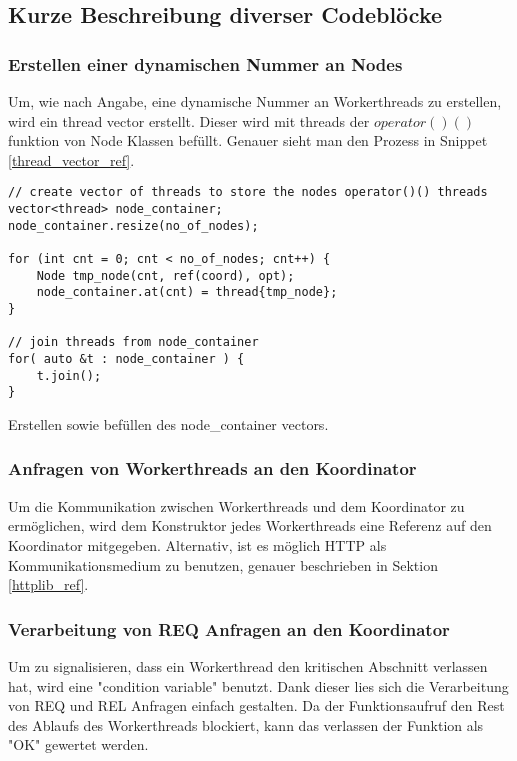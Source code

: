\documentclass[12pt, letterpaper]{article}
\newenvironment{code}{\captionsetup{type=listing}}{}
\begin{document}
\subsection{Kurze Beschreibung diverser Codeblöcke}

\subsubsection{Erstellen einer dynamischen Nummer an Nodes}
Um, wie nach Angabe, eine dynamische Nummer an Workerthreads zu erstellen, wird ein thread vector erstellt. Dieser wird mit threads der $operator()()$ funktion von Node Klassen befüllt.
Genauer sieht man den Prozess in Snippet \ref{thread_vector_ref}.

\begin{code}
\begin{verbatim}
// create vector of threads to store the nodes operator()() threads
vector<thread> node_container;
node_container.resize(no_of_nodes);

for (int cnt = 0; cnt < no_of_nodes; cnt++) {
    Node tmp_node(cnt, ref(coord), opt);
    node_container.at(cnt) = thread{tmp_node};
}

// join threads from node_container
for( auto &t : node_container ) {
    t.join();
}
\end{verbatim}
\caption{Erstellen sowie befüllen des node\_container vectors.}
\label{thread_vector_ref}
\end{code}

\subsubsection{Anfragen von Workerthreads an den Koordinator}
Um die Kommunikation zwischen Workerthreads und dem Koordinator zu ermöglichen, wird dem Konstruktor jedes Workerthreads eine Referenz auf den Koordinator mitgegeben. 
Alternativ, ist es möglich HTTP als Kommunikationsmedium zu benutzen, genauer beschrieben in Sektion \ref{httplib_ref}.

\subsubsection{Verarbeitung von REQ Anfragen an den Koordinator}

Um zu signalisieren, dass ein Workerthread den kritischen Abschnitt verlassen hat, wird eine "condition variable" benutzt. Dank dieser lies sich die Verarbeitung von REQ und REL Anfragen einfach gestalten.
Da der Funktionsaufruf den Rest des Ablaufs des Workerthreads blockiert, kann das verlassen der Funktion als "OK" gewertet werden.
\end{document}
